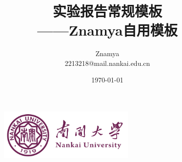 \documentclass[UTF8,a4paper,12pt]{ctexart}
\begin{document}
\title{{\Huge{\textbf{实验报告常规模板}}}\\——Znamya自用模板}
\author{Znamya\\2213218@mail.nankai.edu.cn}
\date{\today}

\fancyhead[L]{\leftmark}%


\fancyhead[R]{\thepage}%


\begin{figure}[t]
\vspace{-8cm}
\begin{center}
    \includegraphics[width=0.6\textwidth]{figs/NKU.png}
\end{center}
\maketitle
\end{figure}
\thispagestyle{empty} %

\clearpage









\end{document}

